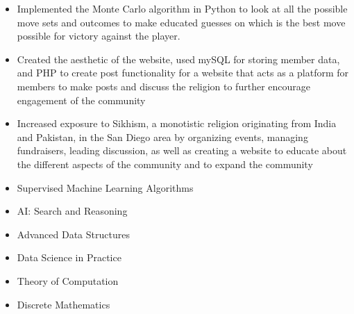 \documentclass[10pt,a4paper,ragged2e,withhyper]{altacv}
\begin{document}
\begin{paracol}{2}
\divider

\begin{itemize}
\item Implemented the Monte Carlo algorithm in Python to look at all the possible move sets and outcomes to make educated guesses on which is the best move possible for victory against the player.
\end{itemize}
 \medskip
 \divider
{}
\begin{itemize}
\item Created the aesthetic of the website, used mySQL for storing member data, and PHP to create post functionality for a website that acts as a platform for members to make posts and discuss the religion to further encourage engagement of the community  
\end{itemize}
 \medskip
\newpage
 
\switchcolumn

 



\begin{itemize}
\item Increased exposure to Sikhism, a monotistic religion originating from India and Pakistan, in the San Diego area by organizing events, managing fundraisers, leading discussion, as well as creating a website to educate about the different aspects of the community  and to expand the community

\end{itemize}

\begin{itemize}
\item Supervised Machine Learning Algorithms   
\item AI: Search and Reasoning   
\item Advanced Data Structures   
\item Data Science in Practice
\item Theory of Computation
\item Discrete Mathematics
\end{itemize}


\end{paracol}
\end{document}
